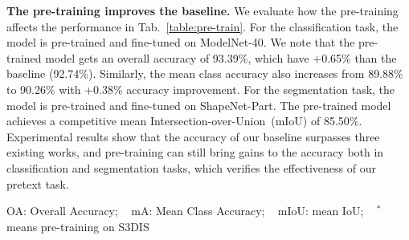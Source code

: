 \documentclass[journal]{IEEEtran}
\begin{document}
\textbf{The pre-training improves the baseline.} We evaluate how the pre-training affects the performance in Tab.~\ref{table:pre-train}. For the classification task, the model is pre-trained and fine-tuned on ModelNet-40. We note that the pre-trained model gets an overall accuracy of 93.39\%, which have +0.65\% than the baseline (92.74\%). Similarly, the mean class accuracy also increases from 89.88\% to 90.26\% with +0.38\% accuracy improvement. For the segmentation task, the model is pre-trained and fine-tuned on ShapeNet-Part. The pre-trained model achieves a competitive mean Intersection-over-Union~(mIoU) of 85.50\%. Experimental results show that the accuracy of our baseline surpasses three existing works, and pre-training can still bring gains to the accuracy both in classification and segmentation tasks, which verifies the effectiveness of our pretext task. 









\begin{table}[t]
\footnotesize
\begin{center}
\vspace{-0.2cm}
\setlength{\tabcolsep}{1.0mm} {
}
\end{center}
\caption{\textcolor{black}{The performance of our method in the real-scan dataset. We pre-train the model on S3DIS and fine-tune the model in 3 different tasks. The results suggest a consistent improvement.}} 
OA: Overall Accuracy; ~
mA: Mean Class Accuracy; ~
mIoU: mean IoU; ~
$^*$ means pre-training on S3DIS
\label{table:s3dis}
\end{table}
\end{document}
